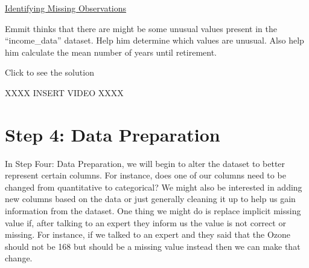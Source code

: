 \documentclass[
  letterpaper,
  DIV=11,
  numbers=noendperiod]{scrreprt}
\newenvironment{Shaded}{\begin{snugshade}}{\end{snugshade}}
\newcommand{\AttributeTok}[1]{\textcolor[rgb]{0.40,0.45,0.13}{#1}}
\newcommand{\ConstantTok}[1]{\textcolor[rgb]{0.56,0.35,0.01}{#1}}
\newcommand{\DecValTok}[1]{\textcolor[rgb]{0.68,0.00,0.00}{#1}}
\newcommand{\FunctionTok}[1]{\textcolor[rgb]{0.28,0.35,0.67}{#1}}
\newcommand{\NormalTok}[1]{\textcolor[rgb]{0.00,0.23,0.31}{#1}}
\newcommand{\OtherTok}[1]{\textcolor[rgb]{0.00,0.23,0.31}{#1}}
\newcommand{\SpecialCharTok}[1]{\textcolor[rgb]{0.37,0.37,0.37}{#1}}
\begin{document}
\begin{watch}{}{}
    \href{https://youtu.be/Qqs3RrHd4xQ}{Identifying Missing Observations}
\end{watch}

\begin{tcolorbox}[enhanced jigsaw, colframe=quarto-callout-tip-color-frame, colback=white, breakable, rightrule=.15mm, title=\textcolor{quarto-callout-tip-color}{\faLightbulb}\hspace{0.5em}{Try it Out}, bottomtitle=1mm, toptitle=1mm, titlerule=0mm, left=2mm, coltitle=black, colbacktitle=quarto-callout-tip-color!10!white, leftrule=.75mm, opacitybacktitle=0.6, bottomrule=.15mm, opacityback=0, arc=.35mm, toprule=.15mm]

Emmit thinks that there are might be some unusual values present in the
``income\_data'' dataset. Help him determine which values are unusual.
Also help him calculate the mean number of years until retirement.

Click to see the solution

XXXX INSERT VIDEO XXXX

\end{tcolorbox}

\section{Step 4: Data Preparation}\label{step-4-data-preparation}

In Step Four: Data Preparation, we will begin to alter the dataset to
better represent certain columns. For instance, does one of our columns
need to be changed from quantitative to categorical? We might also be
interested in adding new columns based on the data or just generally
cleaning it up to help us gain information from the dataset. One thing
we might do is replace implicit missing value if, after talking to an
expert they inform us the value is not correct or missing. For instance,
if we talked to an expert and they said that the Ozone should not be 168
but should be a missing value instead then we can make that change.

\begin{Shaded}
\end{Shaded}
\end{document}

